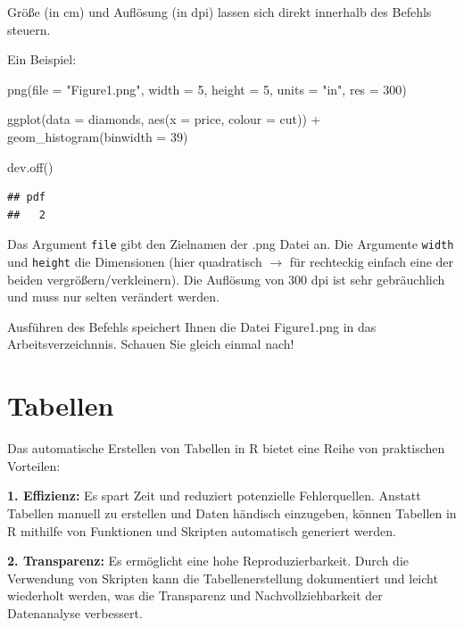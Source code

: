 \documentclass[
]{book}
\newenvironment{Shaded}{\begin{snugshade}}{\end{snugshade}}
\newcommand{\AttributeTok}[1]{\textcolor[rgb]{0.77,0.63,0.00}{#1}}
\newcommand{\DecValTok}[1]{\textcolor[rgb]{0.00,0.00,0.81}{#1}}
\newcommand{\FunctionTok}[1]{\textcolor[rgb]{0.00,0.00,0.00}{#1}}
\newcommand{\NormalTok}[1]{#1}
\newcommand{\SpecialCharTok}[1]{\textcolor[rgb]{0.00,0.00,0.00}{#1}}
\newcommand{\StringTok}[1]{\textcolor[rgb]{0.31,0.60,0.02}{#1}}
\begin{document}
Größe (in cm) und Auflösung (in dpi) lassen sich direkt innerhalb des Befehls steuern.

Ein Beispiel:

\begin{Shaded}
\begin{Highlighting}[]
\FunctionTok{png}\NormalTok{(}\AttributeTok{file =} \StringTok{"Figure1.png"}\NormalTok{, }\AttributeTok{width =} \DecValTok{5}\NormalTok{, }\AttributeTok{height =} \DecValTok{5}\NormalTok{, }\AttributeTok{units =} \StringTok{"in"}\NormalTok{, }\AttributeTok{res =} \DecValTok{300}\NormalTok{)}

\FunctionTok{ggplot}\NormalTok{(}\AttributeTok{data =}\NormalTok{ diamonds, }\FunctionTok{aes}\NormalTok{(}\AttributeTok{x =}\NormalTok{ price, }\AttributeTok{colour =}\NormalTok{ cut)) }\SpecialCharTok{+}
  \FunctionTok{geom\_histogram}\NormalTok{(}\AttributeTok{binwidth =} \DecValTok{39}\NormalTok{)}

\FunctionTok{dev.off}\NormalTok{()}
\end{Highlighting}
\end{Shaded}

\begin{verbatim}
## pdf 
##   2
\end{verbatim}

Das Argument \texttt{file} gibt den Zielnamen der .png Datei an. Die Argumente \texttt{width} und \texttt{height} die Dimensionen (hier quadratisch \(\rightarrow\) für rechteckig einfach eine der beiden vergrößern/verkleinern). Die Auflösung von 300 dpi ist sehr gebräuchlich und muss nur selten verändert werden.

Ausführen des Befehls speichert Ihnen die Datei Figure1.png in das Arbeitsverzeichnnis. Schauen Sie gleich einmal nach!

\hypertarget{tabellen}{%
\chapter{Tabellen}\label{tabellen}}

Das automatische Erstellen von Tabellen in R bietet eine Reihe von praktischen Vorteilen:

\textbf{1. Effizienz:} Es spart Zeit und reduziert potenzielle Fehlerquellen. Anstatt Tabellen manuell zu erstellen und Daten händisch einzugeben, können Tabellen in R mithilfe von Funktionen und Skripten automatisch generiert werden.

\textbf{2. Transparenz:} Es ermöglicht eine hohe Reproduzierbarkeit. Durch die Verwendung von Skripten kann die Tabellenerstellung dokumentiert und leicht wiederholt werden, was die Transparenz und Nachvollziehbarkeit der Datenanalyse verbessert.
\end{document}

